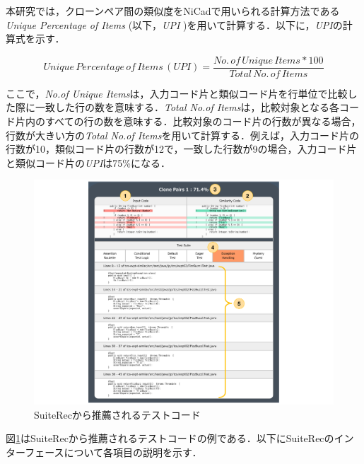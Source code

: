 \documentclass[12pt]{jarticle} %
\begin{document}
本研究では，クローンペア間の類似度を{\sf NiCad}で用いられる計算方法である{\it Unique Percentage of Items} (以下，{\it UPI} )を用いて計算する．以下に，{\it UPI}の計算式を示す．

\[
Unique\, Percentage\, of\, Items\, (UPI) =
\frac{No.\, of\, Unique\, Items * 100}{Total\, No.\, of\, Items}
\]

\vspace{\baselineskip}

ここで，{\it No.of Unique Items}は，入力コード片と類似コード片を行単位で比較した際に一致した行の数を意味する．{\it Total No.of Items}は，比較対象となる各コード片内のすべての行の数を意味する．比較対象のコード片の行数が異なる場合，行数が大きい方の{\it Total No.of Items}を用いて計算する．例えば，入力コード片の行数が10，類似コード片の行数が12で，一致した行数が9の場合，入力コード片と類似コード片の{\it UPI}は75\%になる．

\begin{figure}[htbp]
\begin{center}
\includegraphics[clip,width=15cm]{SuiteRec.pdf}
\caption{{\sf SuiteRec}から推薦されるテストコード}
\label{SR}
\end{center}
\end{figure}

\newpage
図\ref{SR}は{\sf SuiteRec}から推薦されるテストコードの例である．以下に{\sf SuiteRec}のインターフェースについて各項目の説明を示す．
\end{document}
